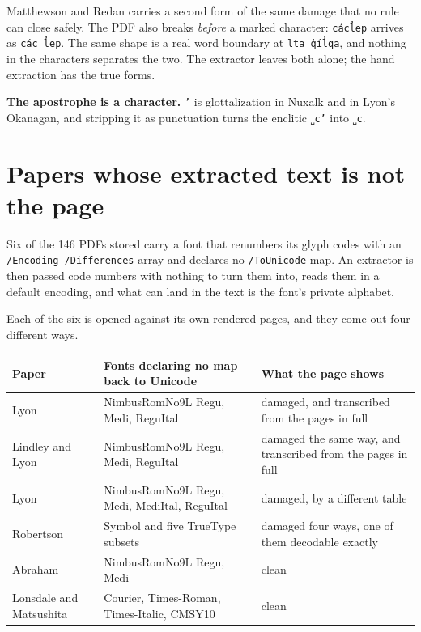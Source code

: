 Matthewson and Redan carries a second form of the same damage that no rule can close safely. The PDF also breaks \emph{before} a marked character: \texttt{cácl̓ep} arrives as \texttt{các l̓ep}. The same shape is a real word boundary at \texttt{lta q̓íl̓qa}, and nothing in the characters separates the two. The extractor leaves both alone; the hand extraction has the true forms.

\textbf{The apostrophe is a character.} \texttt{’} is glottalization in Nuxalk and in Lyon's Okanagan, and stripping it as punctuation turns the enclitic \texttt{˽c’} into \texttt{˽c}.

\section{Papers whose extracted text is not the page}

Six of the 146 PDFs stored carry a font that renumbers its glyph codes with an \texttt{/Encoding /Differences} array and declares no \texttt{/ToUnicode} map. An extractor is then passed code numbers with nothing to turn them into, reads them in a default encoding, and what can land in the text is the font's private alphabet.

Each of the six is opened against its own rendered pages, and they come out four different ways.

\tiny
\setlength{\tabcolsep}{2pt}
\begin{longtable}{@{}>{\raggedright\arraybackslash}p{}>{\raggedright\arraybackslash}p{}>{\raggedright\arraybackslash}p{}@{}}
\toprule
Paper & Fonts declaring no map back to Unicode & What the page shows \\
\midrule
Lyon \cite{src:Lyon-2015} & NimbusRomNo9L Regu, Medi, ReguItal & damaged, and transcribed from the pages in full \\
Lindley and Lyon \cite{src:Lindley-and-Lyon-2013} & NimbusRomNo9L Regu, Medi, ReguItal & damaged the same way, and transcribed from the pages in full \\
Lyon \cite{src:Lyon-2014} & NimbusRomNo9L Regu, Medi, MediItal, ReguItal & damaged, by a different table \\
Robertson \cite{src:Robertson-2012} & Symbol and five TrueType subsets & damaged four ways, one of them decodable exactly \\
Abraham \cite{src:Abraham-2015} & NimbusRomNo9L Regu, Medi & clean \\
Lonsdale and Matsushita \cite{src:Lonsdale-and-Matsushita-2011} & Courier, Times-Roman, Times-Italic, CMSY10 & clean \\
\bottomrule
\end{longtable}
\normalsize

